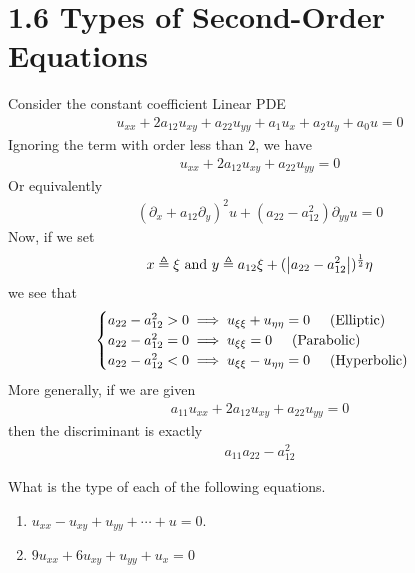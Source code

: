 \documentclass{report}
\begin{document}
\section{1.6 Types of Second-Order Equations} 
\begin{mdframed}
Consider the constant coefficient Linear PDE 
\begin{align*}
u_{xx}+2a_{12}u_{xy}+a_{22}u_{yy}+a_1u_x+a_2u_y+a_0u=0 
\end{align*}
Ignoring the term with order less than $2$, we have 
\begin{align*}
u_{xx}+2a_{12}u_{xy}+a_{22}u_{yy}=0 
\end{align*}
Or equivalently 
\begin{align*}
  (\partial_x + a_{12}\partial_y)^2 u + ( a_{22}-a_{12}^2)\partial_{yy} u =0 
\end{align*}
Now, if we set  
\begin{align*}
x\triangleq \xi \text{ and }y\triangleq a_{12}\xi + (\left|a_{22}-a_{12}^2\right|)^{\frac{1}{2}}\eta 
\end{align*}
we see that 
\begin{align*}
\begin{cases}
  a_{22}-a_{12}^2>0 \implies u_{\xi \xi}+u_{\eta \eta  }=0 \hspace{0.5cm}(\text{Elliptic})\\
  a_{22}-a_{12}^2=0 \implies u_{\xi \xi}=0\hspace{0.5cm}(\text{Parabolic})\\
  a_{22}-a_{12}^2 < 0 \implies u_{\xi \xi}-u_{\eta \eta  }=0\hspace{0.5cm}(\text{Hyperbolic})
\end{cases}
\end{align*}
More generally, if we are given 
\begin{align*}
a_{11}u_{xx}+2a_{12}u_{xy}+a_{22}u_{yy}=0
\end{align*}
then the discriminant is exactly 
\begin{align*}
a_{11}a_{22}-a_{12}^2
\end{align*}
\end{mdframed}
\begin{question}{}{}
What is the type of each of the following equations. 
\begin{enumerate}[label=(\alph*)]
  \item $u_{xx}-u_{xy}+u_{yy}+\cdots +u =0$. 
  \item $9u_{xx}+6u_{xy}+u_{yy}+u_x=0$
\end{enumerate}
\end{question}
\end{document}
